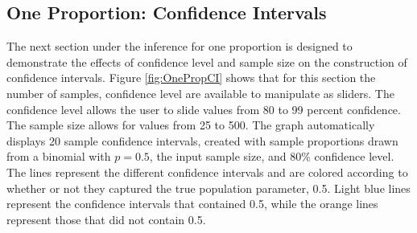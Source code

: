 \documentclass[11pt]{book}
\begin{document}
\subsection{One Proportion: Confidence Intervals}
The next section under the inference for one proportion is designed to demonstrate the effects of confidence level and sample size on the construction of confidence intervals. Figure \ref{fig:OnePropCI} shows that for this section the number of samples, confidence level are available to manipulate as sliders.  The confidence level allows the user to slide values from 80 to 99 percent confidence. The sample size allows for values from 25 to 500.  The graph automatically displays 20 sample confidence intervals, created with sample proportions drawn from a binomial with $p= 0.5$, the input sample size, and $80\%$ confidence level. The lines represent the different confidence intervals and are colored according to whether or not they captured the true population parameter, 0.5.  Light blue lines represent the confidence intervals that contained 0.5, while the orange lines represent those that did not contain 0.5. 
\end{document}
